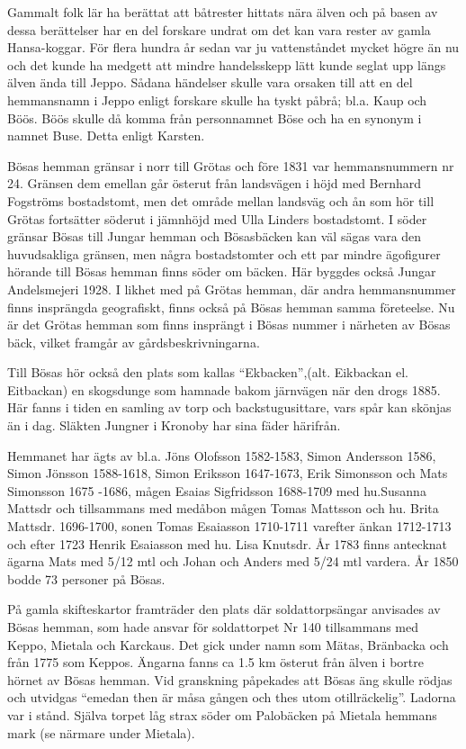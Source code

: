 


Gammalt folk lär ha berättat att båtrester hittats nära älven och på basen av dessa berättelser har en del forskare undrat om det kan vara rester av gamla Hansa-koggar. För flera hundra år sedan var ju vattenståndet mycket högre än nu och det kunde ha medgett att mindre handelsskepp lätt kunde seglat upp längs älven ända till Jeppo. Sådana händelser skulle vara orsaken till att en del hemmansnamn i Jeppo enligt forskare skulle ha tyskt påbrå; bl.a. Kaup och Böös. Böös skulle då komma från personnamnet Böse och ha en synonym i namnet Buse. Detta enligt Karsten.

Bösas hemman gränsar i norr till Grötas och före 1831 var hemmansnummern nr 24. Gränsen dem emellan går österut från landsvägen i höjd med Bernhard Fogströms bostadstomt, men det område mellan landsväg  och ån som hör till Grötas fortsätter söderut i jämnhöjd med Ulla Linders bostadstomt. I söder gränsar Bösas till Jungar hemman och Bösasbäcken kan väl sägas vara den huvudsakliga gränsen, men några bostadstomter och ett par mindre ägofigurer hörande till Bösas hemman finns söder om bäcken. Här byggdes också Jungar Andelsmejeri 1928. I likhet med på Grötas hemman, där andra hemmansnummer finns insprängda geografiskt, finns också på Bösas hemman samma företeelse. Nu är det Grötas hemman som finns insprängt i Bösas nummer i närheten av Bösas bäck, vilket framgår av gårdsbeskrivningarna.

Till Bösas hör också den plats som kallas ``Ekbacken'',(alt. Eikbackan el. Eitbackan) en skogsdunge som hamnade bakom järnvägen när den drogs 1885. Här fanns i tiden en samling av torp och backstugusittare, vars spår kan skönjas än i dag. Släkten Jungner i Kronoby har sina fäder härifrån.

Hemmanet har ägts av bl.a. Jöns Olofsson 1582-1583, Simon Andersson 1586, Simon Jönsson 1588-1618, Simon Eriksson 1647-1673, Erik Simonsson och Mats Simonsson 1675 -1686,  mågen Esaias Sigfridsson 1688-1709 med hu.Susanna Mattsdr och tillsammans med medåbon mågen Tomas Mattsson och hu. Brita Mattsdr. 1696-1700, sonen Tomas Esaiasson 1710-1711 varefter änkan 1712-1713 och efter 1723 Henrik Esaiasson med hu. Lisa Knutsdr. År 1783 finns antecknat ägarna Mats med 5/12 mtl och Johan och Anders med 5/24 mtl vardera. År 1850 bodde 73 personer på Bösas.

På gamla skifteskartor framträder den plats där soldattorpsängar anvisades av Bösas hemman, som hade ansvar för soldattorpet Nr 140 tillsammans med Keppo, Mietala och Karckaus. Det gick under namn som Mätas, Bränbacka och från 1775 som Keppos. Ängarna fanns ca 1.5 km österut från älven i bortre hörnet av Bösas hemman. Vid granskning påpekades att Bösas äng skulle rödjas och utvidgas ``emedan then är måsa gången och thes utom otillräckelig''. Ladorna var i stånd. Själva torpet låg strax söder om Palobäcken på Mietala hemmans mark (se närmare under Mietala).

